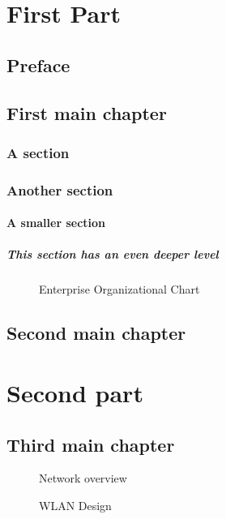 \documentclass{book}
\begin{document}
\tableofcontents
\listoffigures

\part{First Part}
\chapter*{Preface}
\chapter[1st main chapter]{First main chapter}
\section{A section}
\section{Another section}
\subsection{A smaller section}
\subsubsection[Deeper level]{This section has an even deeper level}
\begin{figure}
    \centering
    \caption{Enterprise Organizational Chart}
\end{figure}

\chapter[2nd main chapter]{Second main chapter}

\part{Second part}
\chapter[3rd main chapter]{Third main chapter}
\begin{figure}
    \centering
    \caption{Network overview}
\end{figure}
\begin{figure}
    \centering
    \caption{WLAN Design}
\end{figure}
\end{document}
